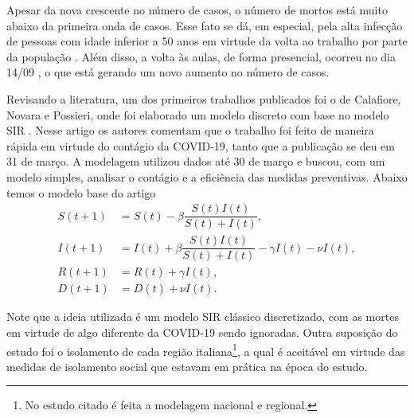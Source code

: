 \documentclass{article}
\begin{document}
Apesar da nova crescente no número de casos, o número de mortos está muito abaixo da primeira onda de casos. Esse fato se dá, em especial, pela alta infecção de pessoas com idade inferior a 50 anos \cite{istoe_idade} em virtude da volta ao trabalho por parte da população \cite{folha_trabalho}. Além disso, a volta às aulas, de forma presencial, ocorreu no dia 14/09 \cite{uol_aulas}, o que está gerando um novo aumento no número de casos.



% 
Revisando a literatura, um dos primeiros trabalhos publicados foi o de Calafiore, Novara e Possieri, onde foi elaborado um modelo discreto com base no modelo SIR \cite{calafiore2020modified}. Nesse artigo os autores comentam que o trabalho foi feito de maneira rápida em virtude do contágio da COVID-19, tanto que a publicação se deu em 31 de março. A modelagem utilizou dados até 30 de março e buscou, com um modelo simples, analisar o contágio e a eficiência das medidas preventivas. Abaixo temos o modelo base do artigo
\begin{equation*}
    \begin{split}
        S(t + 1) & = S(t) - \beta \dfrac{S(t) I(t)}{S(t) + I(t)}, \\
        I(t + 1) & = I(t) + \beta \dfrac{S(t) I(t)}{S(t) + I(t)} - \gamma I(t) - \nu I(t), \\
        R(t + 1) & = R(t) + \gamma I(t), \\
        D(t + 1) & = D(t) + \nu I(t).
    \end{split}
\end{equation*}

Note que a ideia utilizada é um modelo SIR clássico discretizado, com as mortes em virtude de algo diferente da COVID-19 sendo ignoradas. Outra suposição do estudo foi o isolamento de cada região italiana\footnote{No estudo citado é feita a modelagem nacional e regional.}, a qual é aceitável em virtude das medidas de isolamento social que estavam em prática na época do estudo.
\end{document}
